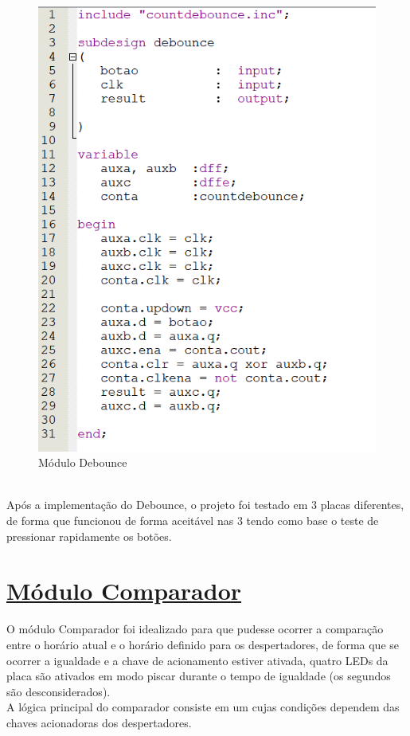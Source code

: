 \documentclass[14pt, oneside]{book}
\newcommand\tab[1][1cm]{\hspace*{#1}}
\theoremstyle{definition}
\begin{document}
                \begin{figure}[H]
                    \centering
                    \includegraphics[scale=0.85]{modulo_debounce.PNG}
                    \caption{Módulo Debounce}
                    \label{fig:debounce}
                \end{figure} \\
                \tab Após a implementação do Debounce, o projeto foi testado em $3$ placas diferentes, de forma que funcionou de forma aceitável nas $3$ tendo como base o teste de pressionar rapidamente os botões.
                
            \section[Módulo Comparador]{\hyperlink{toc}{Módulo Comparador}}
                \tab O módulo Comparador foi idealizado para que pudesse ocorrer a comparação entre o horário atual e o horário definido para os despertadores, de forma que se ocorrer a igualdade e a chave de acionamento estiver ativada, quatro LEDs da placa são ativados em modo piscar durante o tempo de igualdade (os segundos são desconsiderados). \\
                \tab A lógica principal do comparador consiste em um  cujas condições dependem das chaves acionadoras dos despertadores. \\
                
\end{document}
